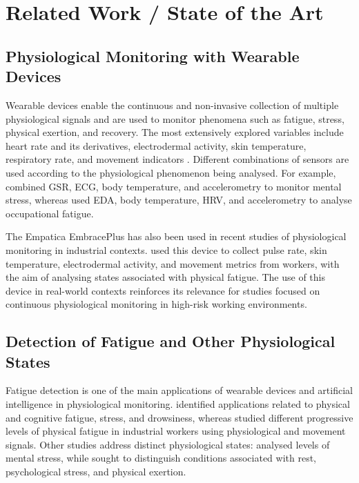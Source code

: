 \documentclass[a4paper,fleqn]{cas-sc}
\begin{document}
\section{Related Work / State of the Art}\label{sec:related}

\subsection{Physiological Monitoring with Wearable Devices}

Wearable devices enable the continuous and non-invasive collection of multiple physiological signals and are used to monitor phenomena such as fatigue, stress, physical exertion, and recovery. The most extensively explored variables include heart rate and its derivatives, electrodermal activity, skin temperature, respiratory rate, and movement indicators \citep{kakhi2025}. Different combinations of sensors are used according to the physiological phenomenon being analysed. For example, \citet{thomas2025} combined GSR, ECG, body temperature, and accelerometry to monitor mental stress, whereas \citet{goutham2025} used EDA, body temperature, HRV, and accelerometry to analyse occupational fatigue.

The Empatica EmbracePlus has also been used in recent studies of physiological monitoring in industrial contexts. \citet{albarran2025} used this device to collect pulse rate, skin temperature, electrodermal activity, and movement metrics from workers, with the aim of analysing states associated with physical fatigue. The use of this device in real-world contexts reinforces its relevance for studies focused on continuous physiological monitoring in high-risk working environments.

\subsection{Detection of Fatigue and Other Physiological States}

Fatigue detection is one of the main applications of wearable devices and artificial intelligence in physiological monitoring. \citet{kakhi2025} identified applications related to physical and cognitive fatigue, stress, and drowsiness, whereas \citet{albarran2025} studied different progressive levels of physical fatigue in industrial workers using physiological and movement signals. Other studies address distinct physiological states: \citet{thomas2025} analysed levels of mental stress, while \citet{georgieva2025} sought to distinguish conditions associated with rest, psychological stress, and physical exertion.
\end{document}
